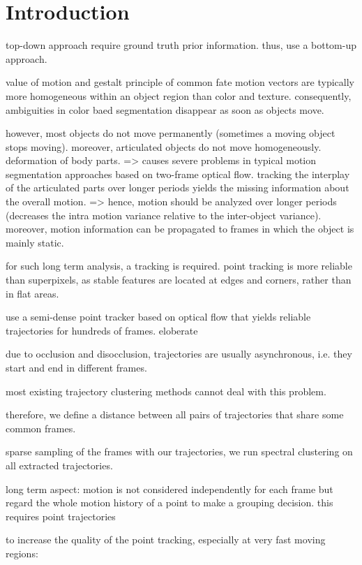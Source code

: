 \chapter{Introduction}

top-down approach require ground truth prior information.
thus, use a bottom-up approach.

value of motion and gestalt principle of common fate
motion vectors are typically more homogeneous within an object region than color and texture. consequently, ambiguities in color baed segmentation disappear as soon as objects move.

however, most objects do not move permanently (sometimes a moving object stops moving). moreover, articulated objects do not move homogeneously. deformation of body parts.
=> causes severe problems in typical motion segmentation approaches based on two-frame optical flow.
tracking the interplay of the articulated parts over longer periods yields the missing information about the overall motion.
=> hence, motion should be analyzed over longer periods (decreases the intra motion variance relative to the inter-object variance). moreover, motion information can be propagated to frames in which the object is mainly static.

for such long term analysis, a tracking is required.
point tracking is more reliable than superpixels, as stable features are located at edges and corners, rather than in flat areas.

use a semi-dense point tracker based on optical flow that yields reliable trajectories for hundreds of frames.
eloberate

due to occlusion and disocclusion, 
trajectories are usually asynchronous, i.e. they start and end in different frames. 

most existing trajectory clustering methods cannot deal with this problem. 

therefore, we define a distance between all pairs of trajectories that share some common frames.

sparse sampling of the frames with our trajectories, 
we run spectral clustering on all extracted trajectories.


long term aspect: motion is not considered independently for each frame but regard the whole motion history of a point to make a grouping decision.
this requires point trajectories

to increase the quality of the point tracking, especially at very fast moving regions: 

